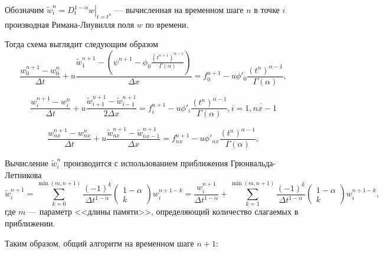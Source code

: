 Обозначим $\tilde{w}^n_i = \left.D^{1-\alpha}_t w \right|_{t=t^n}$ --- вычисленная на временном шаге $n$ в точке $i$ производная Римана-Лиувилля поля $w$ по времени.

Тогда схема выглядит следующим образом
\begin{equation}
	\label{eq:num2}
	\frac{w^{n+1}_{0} - w^{n}_{0}}{\Delta t}
	+ u
	\frac
		{\tilde{w}_1^{n+1} -
			\left( \psi^{n+1} - \phi_0
			\frac
				{\left(t^{n+1}\right)^{\alpha - 1}}
				{\Gamma(\alpha)}
			\right)
		}
		{\Delta x} 
	= f_0^{n+1} - u \phi'_0\frac{\left(t^n\right)^{\alpha - 1}}{\Gamma(\alpha)},
\end{equation}

\begin{equation}
	\label{eq:num3}
	\frac{w^{n+1}_{i} - w^{n}_{i}}{\Delta t}
	+ u \frac{
		\tilde{w}^{n+1}_{i+1} -
		\tilde{w}^{n+1}_{i-1} }
	{2 \Delta x}
	= f_i^{n+1} - u \phi'_{i}\frac{\left(t^n\right)^{\alpha - 1}}{\Gamma(\alpha)},
	i=\overline{1,nx-1}
\end{equation}

\begin{equation}
	\label{eq:num4}
	\frac{w^{n+1}_{nx} - w^{n}_{nx}}{\Delta t}
	+ u \frac{
		\tilde{w}^{n+1}_{nx} -
		\tilde{w}^{n+1}_{nx-1} }
	{\Delta x}
	= f_{nx}^{n+1} - u \phi'_{nx}\frac{\left(t^n\right)^{\alpha - 1}}{\Gamma(\alpha)},
\end{equation}

Вычисление $\tilde{w}^n_i$ производится с использованием приближения Грюнвальда-Летникова
\begin{equation}
	\label{eq:num5}
	\tilde{w}^{n+1}_i
	= \sum_{k=0}^{\min (m,n+1)}
	\frac{(-1)^k}{\Delta t^{1-\alpha}} \begin{pmatrix} 1 - \alpha \\ k \end{pmatrix}
	w^{n+1-k}_{i}
	= \frac{w^{n+1}_{i}}{\Delta t^{1-\alpha}}
	+ \sum_{k=1}^{\min (m,n+1)}
	\frac{(-1)^k}{\Delta t^{1 - \alpha}} \begin{pmatrix} 1 - \alpha \\ k \end{pmatrix}
	w^{n+1-k}_{i},
\end{equation}
где $m$ --- параметр <<длины памяти>>, определяющий количество слагаемых в приближении.

Таким образом, общий алгоритм на временном шаге $n+1$:



